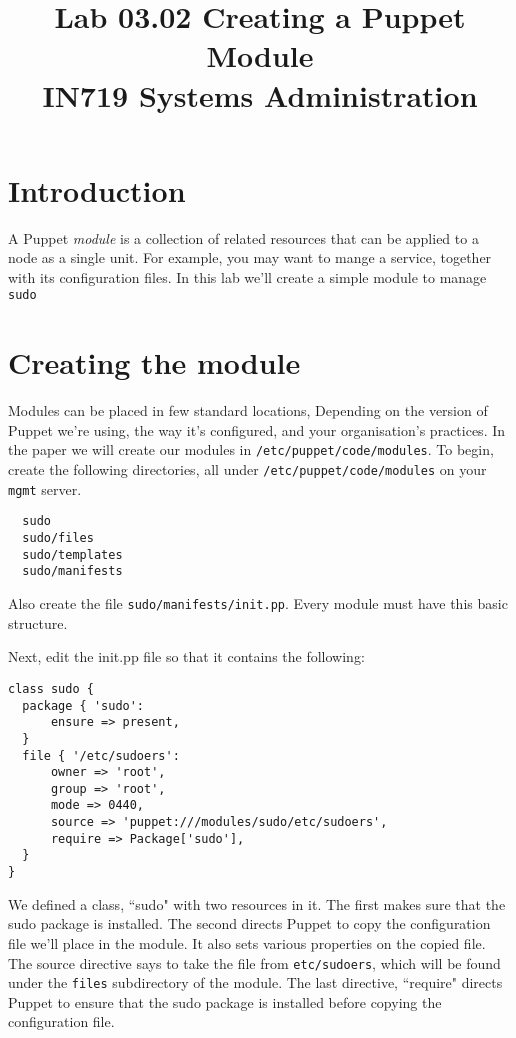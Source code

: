 \documentclass{article}   	%
\title{Lab 03.02 Creating a Puppet Module \\ IN719 Systems Administration}
\date{}							%
\begin{document}
\maketitle

\section*{Introduction}
A Puppet \emph{module} is a collection of related resources that can be applied to a node as a single unit. For example, you may want to mange a service, together with its configuration files.  In this lab we'll create a simple module to manage \texttt{sudo}

\section*{Creating the module}
Modules can be placed in few standard locations, Depending on the version of Puppet we're using, the way it's configured, and your organisation's practices.  In the paper we will create our modules in \texttt{/etc/puppet/code/modules}.  To begin, create the following directories, all under \texttt{/etc/puppet/code/modules} on your \texttt{mgmt} server.
\begin{verbatim}
  sudo
  sudo/files
  sudo/templates
  sudo/manifests
\end{verbatim}
Also create the file \texttt{sudo/manifests/init.pp}.  Every module must have this basic structure.

Next, edit the init.pp file so that it contains the following:


\begin{verbatim}
class sudo {
  package { 'sudo':
      ensure => present,
  }
  file { '/etc/sudoers':
      owner => 'root',
      group => 'root',
      mode => 0440,
      source => 'puppet:///modules/sudo/etc/sudoers',
      require => Package['sudo'],
  }
}
\end{verbatim}

We defined a class, ``sudo" with two resources in it.  The first makes sure that the sudo package is installed.  The second directs Puppet to copy the configuration file we'll place in the module.  It also sets various properties on the copied file.  The source directive says to take the file from \texttt{etc/sudoers}, which will be found under the \texttt{files} subdirectory of the module.  The last directive, ``require" directs Puppet to ensure that the sudo package is installed before copying the configuration file.
\end{document}
